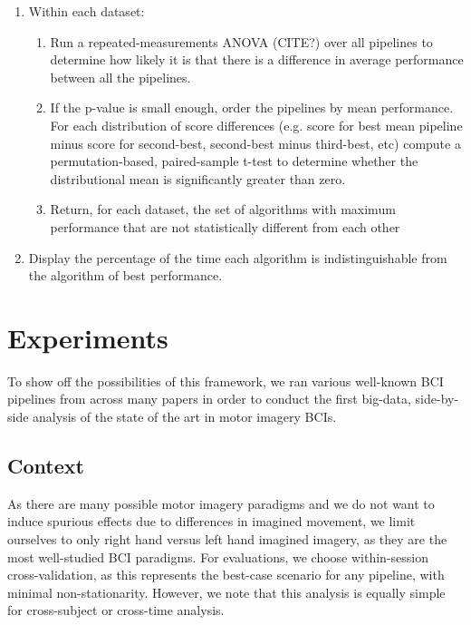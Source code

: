 \begin{enumerate}
\item Within each dataset:
  \begin{enumerate}
  \item Run a repeated-measurements ANOVA (CITE?) over all pipelines to
    determine how likely it is that there is a difference in average performance
    between all the pipelines.
  \item If the p-value is small enough, order the pipelines by mean
    performance. For each distribution of score differences (e.g. score for best
    mean pipeline minus score for second-best, second-best minus third-best,
    etc) compute a permutation-based, paired-sample t-test to
    determine whether the distributional mean is significantly greater than
    zero.
  \item Return, for each dataset, the set of algorithms with maximum performance
    that are not statistically different from each other
  \end{enumerate}
\item Display the percentage of the time each algorithm is indistinguishable
  from the algorithm of best performance.
\end{enumerate}


\section{Experiments}

To show off the possibilities of this framework, we ran various well-known BCI
pipelines from across many papers in order to conduct the first big-data,
side-by-side analysis of the state of the art in motor imagery BCIs.

\subsection{Context}

As there are many possible motor imagery paradigms and we do not want to induce
spurious effects due to differences in imagined movement, we limit ourselves to
only right hand versus left hand imagined imagery, as they are the most
well-studied BCI paradigms\cite{Yuan2014}. For evaluations, we choose
within-session cross-validation, as this represents the best-case scenario for
any pipeline, with minimal non-stationarity. However, we note that this analysis
is equally simple for cross-subject or cross-time analysis.

